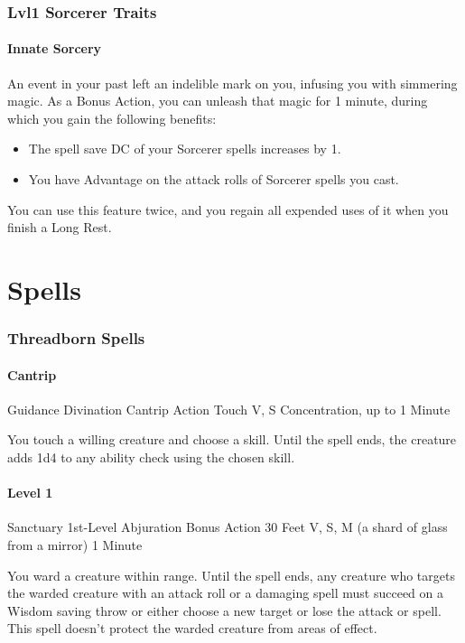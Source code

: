 \documentclass[letterpaper,openany,oneside,twocolumn]{book}
\begin{document}
\section*{Lvl1 Sorcerer Traits}	%
\subsection*{Innate Sorcery}
An event in your past left an indelible mark on you, infusing you with simmering magic. As a Bonus Action, you can unleash that magic for 1 minute, during which you gain the following benefits:
\begin{itemize}
	\item The spell save DC of your Sorcerer spells increases by 1.
	\item You have Advantage on the attack rolls of Sorcerer spells you cast.
\end{itemize}
You can use this feature twice, and you regain all expended uses of it when you finish a Long Rest.

\part*{Spells}
\section*{Threadborn Spells}
\subsection*{Cantrip}
\DndSpellHeader
  {Guidance}
  {Divination Cantrip}
  {Action}
  {Touch}
  {V, S}
  {Concentration, up to 1 Minute}

You touch a willing creature and choose a skill. Until the spell ends, the creature adds 1d4 to any ability check using the chosen skill.

\subsection*{Level 1}
\DndSpellHeader
  {Sanctuary}
  {1st-Level Abjuration}
  {Bonus Action}
  {30 Feet}
  {V, S, M (a shard of glass from a mirror)}
  {1 Minute}

You ward a creature within range. Until the spell ends, any creature who targets the warded creature with an attack roll or a damaging spell must succeed on a Wisdom saving throw or either choose a new target or lose the attack or spell. This spell doesn't protect the warded creature from areas of effect.
\end{document}
